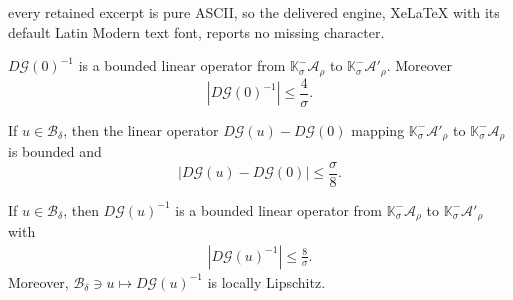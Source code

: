 \documentclass[10pt,a4paper]{amsart}
\newcommand{\A}{{\mathcal A}}
\newcommand{\Bs}{{\mathscr{B}}}
\newcommand{\GG}{{\mathcal G}}
\newcommand{\Kk}{{\mathbb{K}}}
\begin{document}
every retained excerpt is pure ASCII, so the delivered engine, XeLaTeX with its default Latin Modern text font, reports no missing character.
\begin{lemma}\label{lem:DF0} $D\GG(0)^{-1}$ is a bounded linear operator from $\Kk^-_\sigma\A_{\rho}$ to $\Kk^-_\sigma\A'_{\rho}$. Moreover 
$$
|D\GG(0)^{-1}|\leq \frac4\sigma.
$$
\end{lemma}

\begin{lemma}\label{lem:DFu0}
If $u\in\Bs_{\delta}$, then the linear operator $D\GG(u)-D\GG(0)$ mapping $\Kk_\sigma^-\A'_{\rho}$ to $\Kk_\sigma^-\A_{\rho}$ is bounded and
$$
|D\GG(u)-D\GG(0)|\leq \frac{\sigma}{8}.
$$
\end{lemma}

\begin{lemma}\label{lem:DFu}
If $u\in\Bs_{\delta}$, then $D\GG(u)^{-1}$ is a bounded linear operator from $\Kk_\sigma^-\A_{\rho}$ to $\Kk_\sigma^-\A'_{\rho}$ with
\begin{align*}
|D\GG(u)^{-1}|\leq \frac{8}{\sigma}.
\end{align*}
Moreover,  $\Bs_{\delta} \ni u\mapsto D\GG(u)^{-1}$ is locally Lipschitz.
\end{lemma}
\end{document}
